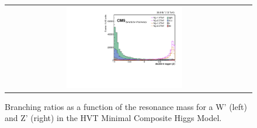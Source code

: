 \begin{figure}[t]
\begin{tabular}{cc}
    \includegraphics[width=0.5\textwidth]{Figures/MC_N1/doubleSV_j1.pdf} \\
  \end{tabular}
  \caption{Branching ratios as a function of the resonance mass for a W' (left) and Z' (right) in the HVT Minimal Composite Higgs Model.}
  \label{fig:hvt_brs}
\end{figure}

